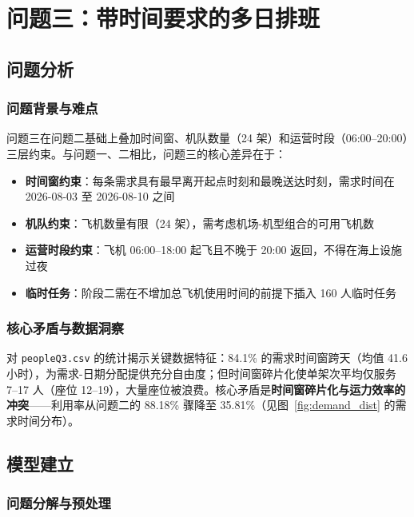 \section{问题三：带时间要求的多日排班}

\subsection{问题分析}

\subsubsection{问题背景与难点}

问题三在问题二基础上叠加时间窗、机队数量（24 架）和运营时段（06:00--20:00）三层约束。与问题一、二相比，问题三的核心差异在于：

\begin{itemize}
\item \textbf{时间窗约束}：每条需求具有最早离开起点时刻和最晚送达时刻，需求时间在 2026-08-03 至 2026-08-10 之间
\item \textbf{机队约束}：飞机数量有限（24 架），需考虑机场-机型组合的可用飞机数
\item \textbf{运营时段约束}：飞机 06:00--18:00 起飞且不晚于 20:00 返回，不得在海上设施过夜
\item \textbf{临时任务}：阶段二需在不增加总飞机使用时间的前提下插入 160 人临时任务
\end{itemize}

\subsubsection{核心矛盾与数据洞察}

对 \texttt{peopleQ3.csv} 的统计揭示关键数据特征：84.1\% 的需求时间窗跨天（均值 41.6 小时），为需求-日期分配提供充分自由度；但时间窗碎片化使单架次平均仅服务 7--17 人（座位 12--19），大量座位被浪费。核心矛盾是\textbf{时间窗碎片化与运力效率的冲突}——利用率从问题二的 88.18\% 骤降至 35.81\%（见图~\ref{fig:demand_dist} 的需求时间分布）。

\subsection{模型建立}

\subsubsection{问题分解与预处理}

